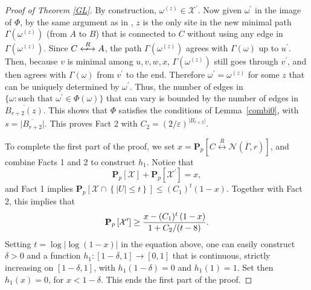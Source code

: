 \documentclass[12pt, twoside,a4paper,reqno]{amsart}
\theoremstyle{plain}
\theoremstyle{remark}
\theoremstyle{definition}
\newcommand{\eps}{\varepsilon}
\newcommand{\lr}[1][]{\overset{\:#1\:}\longleftrightarrow}
\newcommand{\nlr}[1][]{\overset{\:#1\:}{\longleftrightarrow}\!\!\!\!\!\!\!\!\!\arrownot
  \ \, \quad}
\renewcommand{\bar}{\overline}
\begin{document}
\begin{proof} [Proof of Theorem \ref{GL}]
By construction, $\omega^{\left( z\right) }\in \mathcal{X}^{\prime }$. Now given
$\omega ^{\prime }$ in the image of $\Phi$, by the same argument as in
\cite{DST}, $z$ is the only site in the new minimal path $\Gamma (\omega^{(z)})$
(from $A$ to $B$) that is connected to $C$ without using any edge in $\Gamma
(\omega^{(z)})$. Since $C \nlr[R] A$, the path $\Gamma(\omega^{(z)})$ agrees
with $\Gamma(\omega)$ up to $u^{\prime}$. Then, because $v$ is minimal among $u,
v, w, x$, $\Gamma(\omega^{(z)})$ still goes through $v^{\prime}$, and then
agrees with $\Gamma(\omega)$ from $v^{\prime}$ to the end. Therefore $\omega
^{\prime }=\omega ^{\left( z\right) }$ for some $z$ that can be uniquely
determined by $\omega^{\prime }$. Thus, the number of edges in $\{ \omega:
\text{such that } \omega ^{\prime } \in \Phi (\omega)\}$ that can vary is
bounded by the number of edges in $\overline{B_{r+2}( z) }$. This shows that
$\Phi $ satisfies the conditions of Lemma~\ref{combi0}, with
$s=\vert\overline{B_{r+2}}\vert $. This proves Fact 2 with $C_{2}=(2/\eps)
^{\vert \overline{B_{r+2}}\vert }$.

To complete the first part of the proof, we set $x =\mathbf{P}_{p}\left[
  C\lr[R] \mathcal{N}(\bar \Gamma, r)\right]$, and combine
Facts 1 and 2 to construct $h_{1}$. Notice that
\begin{equation}
\mathbf{P}_{p}\left[ \mathcal{X}\right] +\mathbf{P}_{p}\left[ \mathcal{X}%
^{\prime }\right] =x,  \label{sum}
\end{equation}%
and Fact 1 implies $\mathbf{P}_{p}\left[ \mathcal{X}\cap \left\{ \left\vert
U\right\vert \leq t\right\} \right] \leq (C_{1})^{t}\left( 1-x\right) $. Together
with Fact 2, this implies that%
\begin{equation*}
\mathbf{P}_{p}\left[ \mathcal{X}^{\prime }\right] \geq \frac{%
x-(C_{1})^{t}\left( 1-x\right) }{1+C_{2}/(t-8)}.
\end{equation*}%
Setting $t=\log \left\vert \log(1-x) \right\vert$ in the equation above, one can
easily construct $\delta>0$ and a function $h_1:[1-\delta,1]\to [0,1]$ that is
continuous, strictly increasing on $ [1-\delta,1]$, with $h_1(1-\delta)=0$ and
$h_1(1)=1$.
Set then $h_{1}\left( x\right) =0$, for $x<1-\delta$. This ends the first part
of the proof.


\end{proof}
\end{document}
